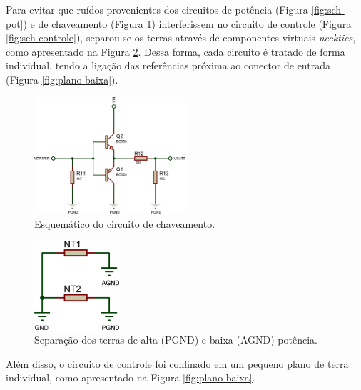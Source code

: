 \documentclass[a4paper]{article}
\begin{document}
{Para evitar que ruídos provenientes dos circuitos de potência (Figura \ref{fig:sch-pot}) e de chaveamento (Figura \ref{fig:sch-chaveamento}) interferissem no circuito de controle (Figura \ref{fig:sch-controle}), separou-se os terras através de componentes virtuais \emph{neckties}, como apresentado na Figura \ref{fig:neckties}. Dessa forma, cada circuito é tratado de forma individual, tendo a ligação das referências próxima ao conector de entrada (Figura \ref{fig:plano-baixa}).

\begin{figure}[H]
	\centering
	\includegraphics[width=0.5\textwidth]{sch-acionamento.jpg}
	\caption{Esquemático do circuito de chaveamento.}
	\label{fig:sch-chaveamento}
\end{figure}

\begin{figure}[H]
	\centering
	\includegraphics[width=0.28\textwidth]{sch-gnds.jpg}
	\caption{Separação dos terras de alta (PGND) e baixa (AGND) potência.}
	\label{fig:neckties}
\end{figure}

Além disso, o circuito de controle foi confinado em um pequeno plano de terra individual, como apresentado na Figura \ref{fig:plano-baixa}.

}
\end{document}
